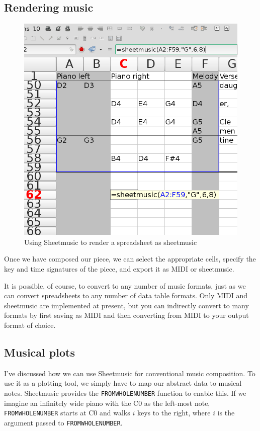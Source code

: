 \documentclass{acm_proc_article-sp}
\begin{document}
\subsection{Rendering music}
\begin{figure}
\includegraphics[width=\columnwidth]{../sheetmusic/sheetmusic-function-call.png}
\centering
\caption{Using Sheetmusic to render a spreadsheet as sheetmusic}
\end{figure}

Once we have composed our piece, we can select the appropriate cells,
specify the key and time signatures of the piece, and export it as
MIDI or sheetmusic.

It is possible, of course, to convert to any number of music formats,
just as we can convert spreadsheets to any number of data table formats.
Only MIDI and sheetmusic are implemented at present, but you can
indirectly convert to many formats by first saving as MIDI and then
converting from MIDI to your output format of choice.

\subsection{Musical plots}
I've discussed how we can use Sheetmusic for conventional music
composition. To use it as a plotting tool, we simply have to map
our abstract data to musical notes. Sheetmusic provides the
\texttt{FROMWHOLENUMBER} function to enable this. If we imagine an
infinitely wide piano with the C0 as the left-most note,
\texttt{FROMWHOLENUMBER} starts at C0 and walks $i$ keys to the right,
where $i$ is the argument passed to \texttt{FROMWHOLENUMBER}.
\end{document}
